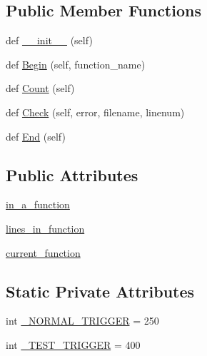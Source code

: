 \subsection*{Public Member Functions}
\begin{DoxyCompactItemize}
\item 
def \hyperlink{classcpplint_1_1__FunctionState_a3f6a865710852cc74c6a7085180458ae}{\+\_\+\+\_\+init\+\_\+\+\_\+} (self)
\item 
def \hyperlink{classcpplint_1_1__FunctionState_a41215c4d73baccbb340f6d0df1c1f4b3}{Begin} (self, function\+\_\+name)
\item 
def \hyperlink{classcpplint_1_1__FunctionState_ac25c9711911ae181b091b52619cf2701}{Count} (self)
\item 
def \hyperlink{classcpplint_1_1__FunctionState_a5e4ad7d7b104038b45204ab4abf527b2}{Check} (self, error, filename, linenum)
\item 
def \hyperlink{classcpplint_1_1__FunctionState_a1ab6b0a575c25c135f9004b7fb12dc4a}{End} (self)
\end{DoxyCompactItemize}
\subsection*{Public Attributes}
\begin{DoxyCompactItemize}
\item 
\hyperlink{classcpplint_1_1__FunctionState_a8362d472591f60462184bf68b49c0efb}{in\+\_\+a\+\_\+function}
\item 
\hyperlink{classcpplint_1_1__FunctionState_a886f5d476adc81f499a711750a399aa2}{lines\+\_\+in\+\_\+function}
\item 
\hyperlink{classcpplint_1_1__FunctionState_a320674f54bd75087febc8f0d83620569}{current\+\_\+function}
\end{DoxyCompactItemize}
\subsection*{Static Private Attributes}
\begin{DoxyCompactItemize}
\item 
int \hyperlink{classcpplint_1_1__FunctionState_ae2f376f56543b11b1f7401ee114ccdda}{\+\_\+\+N\+O\+R\+M\+A\+L\+\_\+\+T\+R\+I\+G\+G\+ER} = 250
\item 
int \hyperlink{classcpplint_1_1__FunctionState_abf36a858161d5f1cac149e2dcad09946}{\+\_\+\+T\+E\+S\+T\+\_\+\+T\+R\+I\+G\+G\+ER} = 400
\end{DoxyCompactItemize}


